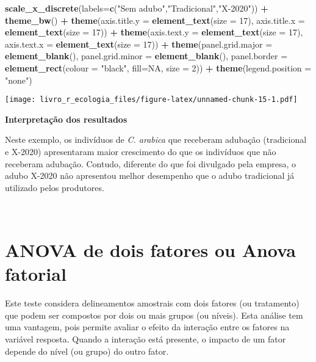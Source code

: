 \documentclass[
]{book}
\newenvironment{Shaded}{\begin{snugshade}}{\end{snugshade}}
\newcommand{\DataTypeTok}[1]{\textcolor[rgb]{0.13,0.29,0.53}{#1}}
\newcommand{\DecValTok}[1]{\textcolor[rgb]{0.00,0.00,0.81}{#1}}
\newcommand{\KeywordTok}[1]{\textcolor[rgb]{0.13,0.29,0.53}{\textbf{#1}}}
\newcommand{\NormalTok}[1]{#1}
\newcommand{\OperatorTok}[1]{\textcolor[rgb]{0.81,0.36,0.00}{\textbf{#1}}}
\newcommand{\OtherTok}[1]{\textcolor[rgb]{0.56,0.35,0.01}{#1}}
\newcommand{\StringTok}[1]{\textcolor[rgb]{0.31,0.60,0.02}{#1}}
\begin{document}
\begin{Shaded}
\begin{Highlighting}[]
\StringTok{  }\KeywordTok{scale_x_discrete}\NormalTok{(}\DataTypeTok{labels=}\KeywordTok{c}\NormalTok{(}\StringTok{"Sem adubo"}\NormalTok{,}\StringTok{"Tradicional"}\NormalTok{,}\StringTok{"X-2020"}\NormalTok{)) }\OperatorTok{+}
\StringTok{  }\KeywordTok{theme_bw}\NormalTok{() }\OperatorTok{+}
\StringTok{  }\KeywordTok{theme}\NormalTok{(}\DataTypeTok{axis.title.y =} \KeywordTok{element_text}\NormalTok{(}\DataTypeTok{size =} \DecValTok{17}\NormalTok{), }\DataTypeTok{axis.title.x =} \KeywordTok{element_text}\NormalTok{(}\DataTypeTok{size =} \DecValTok{17}\NormalTok{)) }\OperatorTok{+}
\StringTok{  }\KeywordTok{theme}\NormalTok{(}\DataTypeTok{axis.text.y =} \KeywordTok{element_text}\NormalTok{(}\DataTypeTok{size =} \DecValTok{17}\NormalTok{), }\DataTypeTok{axis.text.x =} \KeywordTok{element_text}\NormalTok{(}\DataTypeTok{size =} \DecValTok{17}\NormalTok{)) }\OperatorTok{+}
\StringTok{  }\KeywordTok{theme}\NormalTok{(}\DataTypeTok{panel.grid.major =} \KeywordTok{element_blank}\NormalTok{(), }\DataTypeTok{panel.grid.minor =} \KeywordTok{element_blank}\NormalTok{(), }
        \DataTypeTok{panel.border =} \KeywordTok{element_rect}\NormalTok{(}\DataTypeTok{colour =} \StringTok{"black"}\NormalTok{, }\DataTypeTok{fill=}\OtherTok{NA}\NormalTok{, }\DataTypeTok{size =} \DecValTok{2}\NormalTok{)) }\OperatorTok{+}
\StringTok{  }\KeywordTok{theme}\NormalTok{(}\DataTypeTok{legend.position =} \StringTok{"none"}\NormalTok{) }
\end{Highlighting}
\end{Shaded}

\texttt{[image: livro\_r\_ecologia\_files/figure-latex/unnamed-chunk-15-1.pdf]}

\textbf{Interpretação dos resultados}

Neste exemplo, os indivíduos de \emph{C. arabica} que receberam adubação (tradicional e X-2020) apresentaram maior crescimento do que os indivíduos que não receberam adubação. Contudo, diferente do que foi divulgado pela empresa, o adubo X-2020 não apresentou melhor desempenho que o adubo tradicional já utilizado pelos produtores.

~

\hypertarget{anova-de-dois-fatores-ou-anova-fatorial}{%
\section{ANOVA de dois fatores ou Anova fatorial}\label{anova-de-dois-fatores-ou-anova-fatorial}}

Este teste considera delineamentos amostrais com dois fatores (ou tratamento) que podem ser compostos por dois ou mais grupos (ou níveis). Esta análise tem uma vantagem, pois permite avaliar o efeito da interação entre os fatores na variável resposta. Quando a interação está presente, o impacto de um fator depende do nível (ou grupo) do outro fator.
\end{document}

